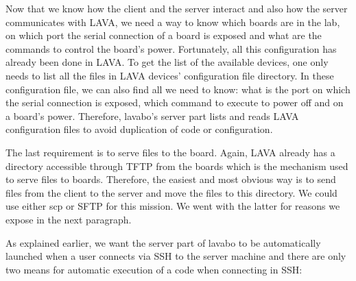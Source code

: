 Now that we know how the client and the server interact and also how the server communicates with LAVA, we need a way to know which boards are in the lab, on which port the serial connection of a board is exposed and what are the commands to control the board's power. Fortunately, all this configuration has already been done in LAVA. To get the list of the available devices, one only needs to list all the files in LAVA devices' configuration file directory. In these configuration file, we can also find all we need to know: what is the port on which the serial connection is exposed, which command to execute to power off and on a board's power. Therefore, lavabo's server part lists and reads LAVA configuration files to avoid duplication of code or configuration.

The last requirement is to serve files to the board. Again, LAVA already has a directory accessible through TFTP from the boards which is the mechanism used to serve files to boards. Therefore, the easiest and most obvious way is to send files from the client to the server and move the files to this directory. We could use either scp or SFTP for this mission. We went with the latter for reasons we expose in the next paragraph.

As explained earlier, we want the server part of lavabo to be automatically launched when a user connects via SSH to the server machine and there are only two means for automatic execution of a code when connecting in SSH:

